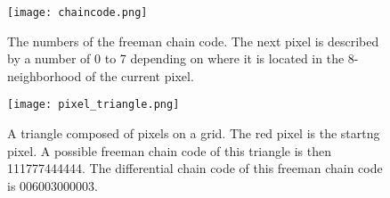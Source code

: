 \documentclass[thesis.tex]{subfiles}
\begin{document}
\begin{figure}[h]
\centering
\texttt{[image: chaincode.png]}
\caption{The numbers of the freeman chain code. The next pixel is described by a number of 0 to 7 depending on where it is located in the 8-neighborhood of the current pixel.}
\label{fig:freeman}
\end{figure}

\begin{figure}[h]
\centering
\texttt{[image: pixel\_triangle.png]}
\caption{A triangle composed of pixels on a grid. The red pixel is the startng pixel. A possible freeman chain code of this triangle is then 111777444444. The differential chain code of this freeman chain code is 006003000003.}
\label{fig:pixel_triangle}
\end{figure}

\subfilebib %
\end{document}
